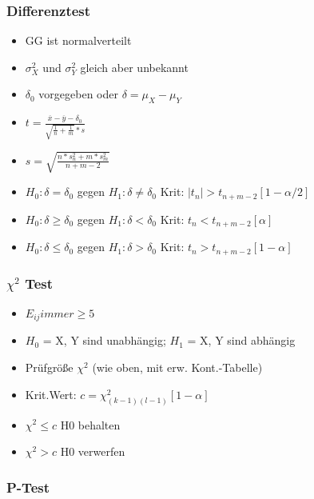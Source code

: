 \documentclass[a4paper]{article}
\begin{document}
\begin{landscape}
\begin{multicols}{4}
        \subsubsection*{Differenztest}
        \begin{itemize}[noitemsep,nolistsep,leftmargin=*]
            \item GG ist normalverteilt
            \item $\sigma^2_X$ und $\sigma^2_Y$ gleich aber unbekannt
            \item $\delta_0$ vorgegeben oder $\delta = \mu_X - \mu_Y$
            \item $t = \frac{\overline{x}-\overline{y}-\delta_0}{\sqrt{\frac{1}{n}+\frac{1}{m}}* s}$
            \item $s = \sqrt{\frac{n*s^2_n + m*s^2_m}{n+m-2}}$
            \item $H_0: \delta=\delta_0$ gegen $H_1: \delta \neq \delta_0$ Krit: $|t_n| > t_{n+m-2}[1-\alpha/2]$
            \item  $H_0: \delta \geq\delta_0$ gegen $H_1: \delta < \delta_0$ Krit: $t_n < t_{n+m-2}[\alpha]$
            \item $H_0: \delta \leq\delta_0$ gegen $H_1: \delta > \delta_0$ Krit: $t_n > t_{n+m-2}[1-\alpha]$
        \end{itemize}
        
        \subsubsection*{$\chi^2$ Test}
        \begin{itemize}[noitemsep,nolistsep,leftmargin=*]
            \item $E_{ij} immer  \geq 5$
            \item $H_0$ = X, Y sind unabhängig; $H_1$ = X, Y sind abhängig 
            \item Prüfgröße $\chi^2$ (wie oben, mit erw. Kont.-Tabelle)
            \item Krit.Wert: $c = \chi^2_{(k-1)(l-1)}[1-\alpha]$
            \item $\chi^2  \leq c$ H0 behalten
            \item $\chi^2 > c$ H0 verwerfen
        \end{itemize}
        \subsubsection*{P-Test}





\end{multicols}
\end{landscape}
\end{document}
